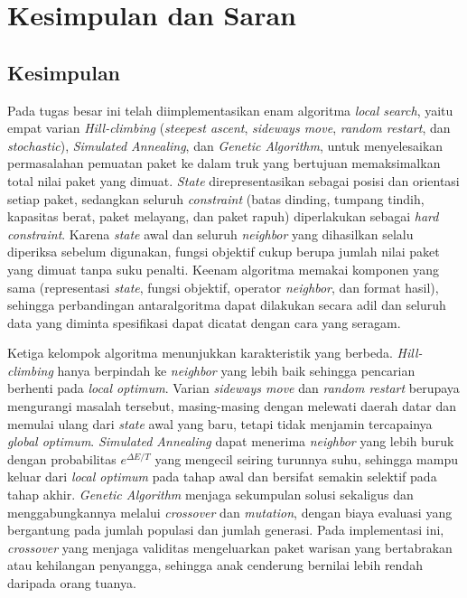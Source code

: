 \chapter{Kesimpulan dan Saran}

\section{Kesimpulan}

Pada tugas besar ini telah diimplementasikan enam algoritma \textit{local search}, yaitu empat varian \textit{Hill-climbing} (\textit{steepest ascent}, \textit{sideways move}, \textit{random restart}, dan \textit{stochastic}), \textit{Simulated Annealing}, dan \textit{Genetic Algorithm}, untuk menyelesaikan permasalahan pemuatan paket ke dalam truk yang bertujuan memaksimalkan total nilai paket yang dimuat. \textit{State} direpresentasikan sebagai posisi dan orientasi setiap paket, sedangkan seluruh \textit{constraint} (batas dinding, tumpang tindih, kapasitas berat, paket melayang, dan paket rapuh) diperlakukan sebagai \textit{hard constraint}. Karena \textit{state} awal dan seluruh \textit{neighbor} yang dihasilkan selalu diperiksa sebelum digunakan, fungsi objektif cukup berupa jumlah nilai paket yang dimuat tanpa suku penalti. Keenam algoritma memakai komponen yang sama (representasi \textit{state}, fungsi objektif, operator \textit{neighbor}, dan format hasil), sehingga perbandingan antaralgoritma dapat dilakukan secara adil dan seluruh data yang diminta spesifikasi dapat dicatat dengan cara yang seragam.

Ketiga kelompok algoritma menunjukkan karakteristik yang berbeda. \textit{Hill-climbing} hanya berpindah ke \textit{neighbor} yang lebih baik sehingga pencarian berhenti pada \textit{local optimum}. Varian \textit{sideways move} dan \textit{random restart} berupaya mengurangi masalah tersebut, masing-masing dengan melewati daerah datar dan memulai ulang dari \textit{state} awal yang baru, tetapi tidak menjamin tercapainya \textit{global optimum}. \textit{Simulated Annealing} dapat menerima \textit{neighbor} yang lebih buruk dengan probabilitas $e^{\Delta E/T}$ yang mengecil seiring turunnya suhu, sehingga mampu keluar dari \textit{local optimum} pada tahap awal dan bersifat semakin selektif pada tahap akhir. \textit{Genetic Algorithm} menjaga sekumpulan solusi sekaligus dan menggabungkannya melalui \textit{crossover} dan \textit{mutation}, dengan biaya evaluasi yang bergantung pada jumlah populasi dan jumlah generasi. Pada implementasi ini, \textit{crossover} yang menjaga validitas mengeluarkan paket warisan yang bertabrakan atau kehilangan penyangga, sehingga anak cenderung bernilai lebih rendah daripada orang tuanya.

